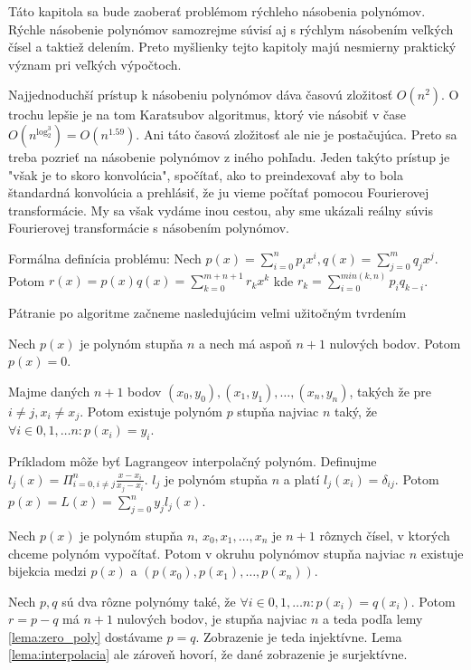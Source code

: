 Táto kapitola sa bude zaoberať problémom rýchleho násobenia polynómov.
Rýchle násobenie polynómov samozrejme súvisí aj s rýchlym násobením
veľkých čísel a taktiež delením. Preto myšlienky tejto kapitoly majú
 nesmierny praktický význam pri veľkých výpočtoch.


Najjednoduchší prístup k násobeniu polynómov dáva časovú zložitosť
$O(n^2)$. O trochu lepšie je na tom Karatsubov algoritmus, ktorý vie
násobiť v čase $O(n^{\log_2^3})=O(n^{1.59})$. Ani táto časová
zložitosť ale nie je postačujúca. Preto sa treba pozrieť na násobenie
polynómov z iného pohľadu. Jeden takýto prístup je "však je to skoro
konvolúcia", spočítať, ako to preindexovať aby to bola štandardná
konvolúcia a prehlásiť, že ju vieme počítať pomocou Fourierovej
transformácie. My sa však vydáme inou cestou, aby sme ukázali reálny
súvis Fourierovej transformácie s násobením polynómov.

Formálna definícia problému:
Nech $p(x)=\sum_{i=0}^{n} p_i x^i, q(x) = \sum_{j=0}^{m} q_j x^j$.
Potom $r(x) = p(x) q(x) = \sum_{k=0}^{m+n+1} r_k x^k$ kde
$r_k = \sum_{i=0}^{min(k,n)} p_i q_{k-i}$.

Pátranie po algoritme začneme nasledujúcim veľmi užitočným tvrdením
\begin{lema}
 Nech $p(x)$ je polynóm stupňa $n$ a nech má aspoň $n+1$ nulových
 bodov. Potom $p(x)=0$.
 \label{lema:zero_poly}
\end{lema}

\begin{lema}[O interpolácii]
 Majme daných $n+1$ bodov $(x_0,y_0), (x_1,y_1), \dots, (x_n,y_n)$,
 takých že pre $i\not=j, x_i\not=x_j$.
 Potom existuje polynóm $p$ stupňa najviac $n$ taký, že
 $\forall i\in 0,1,\dots n: p(x_i)=y_i$.
\label{lema:interpolacia}
\end{lema}
\begin{dokaz}
 Príkladom môže byť Lagrangeov interpolačný polynóm.
 Definujme $l_j(x) = \Pi_{i=0,i\not=j}^{n} \frac{x-x_i}{x_j-x_i}$.
 $l_j$ je polynóm stupňa $n$ a platí $l_j(x_i) = \delta_{ij}$.
 Potom $p(x) = L(x) = \sum_{j=0}^{n} y_j l_j(x)$.
\end{dokaz}

\begin{lema}
Nech $p(x)$ je polynóm stupňa $n$, $x_0,x_1,\dots,x_n$ je $n+1$
rôznych čísel, v ktorých chceme polynóm vypočítať.
Potom v okruhu polynómov stupňa najviac $n$ existuje bijekcia medzi $p(x)$
a $(p(x_0),p(x_1),\dots,p(x_{n}))$.
\end{lema}
\begin{dokaz}
Nech $p,q$ sú dva rôzne polynómy také, že $\forall i\in 0,1,\dots n:
p(x_i) = q(x_i)$. Potom $r=p-q$ má $n+1$ nulových bodov, je stupňa
najviac $n$ a teda podľa lemy \ref{lema:zero_poly} dostávame $p=q$.
Zobrazenie je teda injektívne. Lema \ref{lema:interpolacia} ale
zároveň hovorí, že dané zobrazenie je surjektívne.
\end{dokaz}

